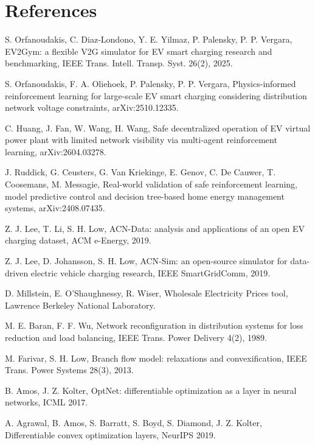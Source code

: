 \documentclass[11pt]{article}
\begin{document}
\section*{References}
\footnotesize\setlength{\itemsep}{2pt}
\begin{list}{}{\setlength{\leftmargin}{2.4em}\setlength{\labelwidth}{2.4em}\setlength{\itemsep}{2pt}\setlength{\parsep}{0pt}}
\item[\rrow{ev2gym}] S. Orfanoudakis, C. Diaz-Londono, Y. E. Yilmaz, P. Palensky, P. P. Vergara, EV2Gym: a flexible V2G simulator for EV smart charging research and benchmarking, IEEE Trans. Intell. Transp. Syst. 26(2), 2025.
\item[\rrow{pitd3}] S. Orfanoudakis, F. A. Oliehoek, P. Palensky, P. P. Vergara, Physics-informed reinforcement learning for large-scale EV smart charging considering distribution network voltage constraints, arXiv:2510.12335.
\item[\rrow{tlmappo}] C. Huang, J. Fan, W. Wang, H. Wang, Safe decentralized operation of EV virtual power plant with limited network visibility via multi-agent reinforcement learning, arXiv:2604.03278.
\item[\rrow{ruddick}] J. Ruddick, G. Ceusters, G. Van Kriekinge, E. Genov, C. De Cauwer, T. Coosemans, M. Messagie, Real-world validation of safe reinforcement learning, model predictive control and decision tree-based home energy management systems, arXiv:2408.07435.
\item[\rrow{acn}] Z. J. Lee, T. Li, S. H. Low, ACN-Data: analysis and applications of an open EV charging dataset, ACM e-Energy, 2019.
\item[\rrow{acnsim}] Z. J. Lee, D. Johansson, S. H. Low, ACN-Sim: an open-source simulator for data-driven electric vehicle charging research, IEEE SmartGridComm, 2019.
\item[\rrow{wep}] D. Millstein, E. O'Shaughnessy, R. Wiser, Wholesale Electricity Prices tool, Lawrence Berkeley National Laboratory.
\item[\rrow{baranwu}] M. E. Baran, F. F. Wu, Network reconfiguration in distribution systems for loss reduction and load balancing, IEEE Trans. Power Delivery 4(2), 1989.
\item[\rrow{farivar}] M. Farivar, S. H. Low, Branch flow model: relaxations and convexification, IEEE Trans. Power Systems 28(3), 2013.
\item[\rrow{optnet}] B. Amos, J. Z. Kolter, OptNet: differentiable optimization as a layer in neural networks, ICML 2017.
\item[\rrow{cvxpylayers}] A. Agrawal, B. Amos, S. Barratt, S. Boyd, S. Diamond, J. Z. Kolter, Differentiable convex optimization layers, NeurIPS 2019.

\end{list}
\end{document}
